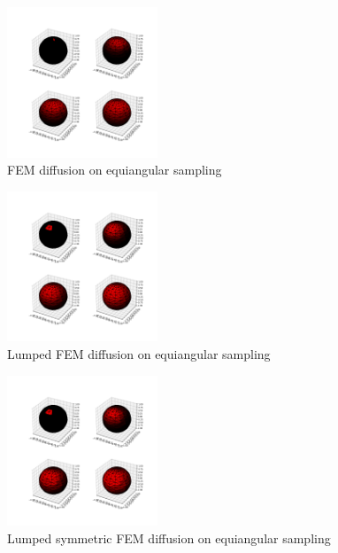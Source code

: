 \begin{figure}[h]
	\label{fig:FEM diffusion on equiangular sampling}
	\centering
	\includegraphics[width=0.4\textwidth]{../codes/03.FEM_laplacian/equiangular/mass_lumping/BL/img/FEM_diffusion.png}
	\caption{ FEM diffusion on equiangular sampling}
\end{figure}
\begin{figure}[h]
	\label{fig:FEM lumped diffusion on equiangular sampling}	
	\centering
	\includegraphics[width=0.4\textwidth]{../codes/03.FEM_laplacian/equiangular/mass_lumping/BL/img/FEM_lumped_diffusion.png}	
	\caption{Lumped FEM diffusion on equiangular sampling}
\end{figure}
\begin{figure}[h]
	\label{fig:FEM lumped symmetric diffusion on equiangular sampling}
	\centering
	\includegraphics[width=0.4\textwidth]{../codes/03.FEM_laplacian/equiangular/mass_lumping/BL/img/FEM_lumped_symmetric_diffusion.png}
	\caption{Lumped symmetric FEM diffusion on equiangular sampling}
\end{figure}

